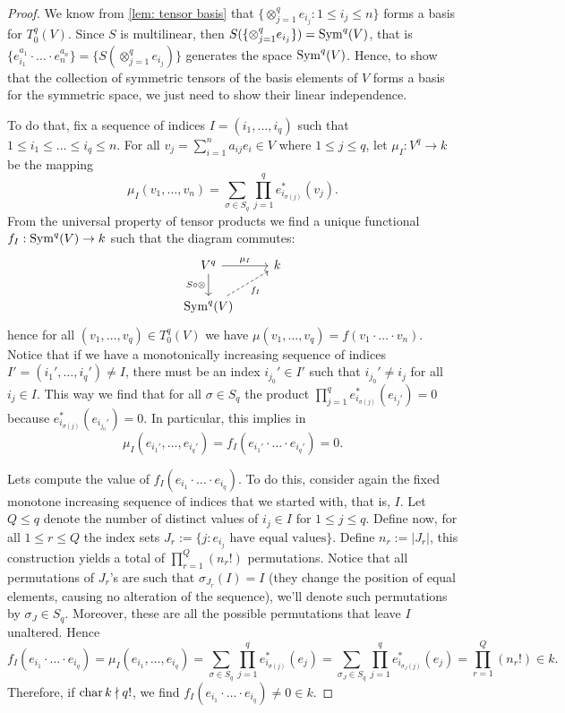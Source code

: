 \begin{proof}
  We know from \cref{lem: tensor basis} that \(\{\otimes_{j=1}^q e_{i_j}: 1 \leq
  i_j \leq n\}\) forms a basis for \(T_0^q(V)\). Since \(S\) is multilinear,
  then \(S(\{\otimes_{j=1}^q e_{i_j}\}) = \operatorname{Sym}^q(V)\), that is \(\{e_{i_1}^{a_1}
  \cdot \ldots \cdot e_n^{a_n}\} = \{S(\otimes_{j=1}^q e_{i_j})\}\) generates
  the space \(\operatorname{Sym}^q(V)\). Hence, to show that the collection of symmetric
  tensors of the basis elements of \(V\) forms a basis for the symmetric space,
  we just need to show their linear independence.

  To do that, fix a sequence of indices \(I = (i_1, \dots, i_q)\) such that  \(1
  \leq i_1 \leq \dots \leq i_q \leq n\). For all \(v_j = \sum_{i=1}^n a_{ij} e_i
  \in V\) where \(1 \leq j \leq q\), let \(\mu_I: V^q \to k\) be the mapping
  \[
    \mu_I(v_1, \dots, v_n) = \sum_{\sigma \in S_q} \prod_{j=1}^q
    e_{i_{\sigma(j)}}^*(v_j).
  \]
  From the universal property of tensor products we find a unique
  functional \(f_I: \operatorname{Sym}^q(V) \to k\) such that the diagram commutes:
  \[
    \begin{tikzcd}
      V^q \ar[r, "\mu_I"] \ar[d, swap, "S \circ \otimes"] &k \\
      \Sym^q(V) \ar[ru, swap, dashed, "f_I"]
    \end{tikzcd}
  \]
  hence for all \((v_1, \dots, v_q) \in T_0^q(V)\) we have \(\mu(v_1, \dots,
  v_q) = f(v_1 \cdot \ldots \cdot v_n)\). Notice that if we have a monotonically
  increasing sequence of indices \(I' = (i_1', \dots, i_q') \neq I\), there must
  be an index \(i_{j_0}' \in I'\) such that \(i_{j_0}' \neq i_j\) for all \(i_j
  \in I\). This way we find that for all \(\sigma \in S_q\) the product
  \(\prod_{j=1}^q e_{i_{\sigma(j)}}^*(e_{i_j'}) = 0\) because
  \(e_{i_{\sigma(j)}}^*(e_{i_{j_0}'}) = 0\). In particular, this implies in
  \[
    \mu_I(e_{i_1'}, \dots, e_{i_q'}) = f_I(e_{i_1'} \cdot \ldots \cdot e_{i_q'})
    = 0.
  \]

  Lets compute the value of \(f_I(e_{i_1} \cdot \ldots \cdot e_{i_q})\). To do
  this, consider again the fixed monotone increasing sequence of indices that we
  started with, that is, \(I\). Let \(Q \leq q\) denote the number of distinct
  values of \(i_j \in I\) for \(1 \leq j \leq q\). Define now, for all \(1 \leq
  r \leq Q\) the index sets \(J_r := \{j : e_{i_j} \text{ have equal
  values}\}\). Define \(n_r := |J_r|\), this construction yields a total of
  \(\prod_{r=1}^Q (n_r!)\) permutations. Notice that all permutations of
  \(J_r\)'s are such that \(\sigma_{J_r}(I) = I\) (they change the position of
  equal elements, causing no alteration of the sequence), we'll denote such
  permutations by \(\sigma_J \in S_q\). Moreover, these are
  all the possible permutations that leave \(I\) unaltered. Hence
  \[
    f_I(e_{i_1} \cdot \ldots \cdot e_{i_q}) = \mu_I(e_{i_1}, \dots, e_{i_q})
    = \sum_{\sigma \in S_q} \prod_{j=1}^q e_{i_{\sigma(j)}}^*(e_j)
    = \sum_{\sigma_J \in S_q} \prod_{j=1}^q e_{i_{\sigma_J(j)}}^*(e_j)
    = \prod_{r=1}^Q (n_r!) \in k.
  \]
  Therefore, if \(\operatorname{char} k \nmid q!\), we find \(f_I(e_{i_1} \cdot \ldots \cdot
  e_{i_q}) \neq 0 \in k\).


\end{proof}
